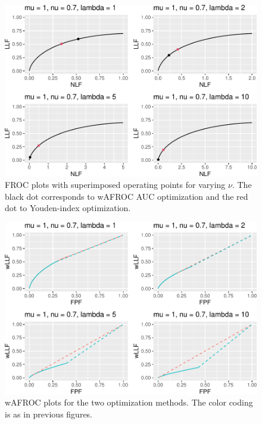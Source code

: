 \documentclass[
]{book}
\begin{document}
\begin{figure}
\centering
\includegraphics{21-optim-op-point_files/figure-latex/optim-op-point-low-performance-vary-lambda-vary-all-froc-1.pdf}
\caption{\label{fig:optim-op-point-low-performance-vary-lambda-vary-all-froc}FROC plots with superimposed operating points for varying \(\nu\). The black dot corresponds to wAFROC AUC optimization and the red dot to Youden-index optimization.}
\end{figure}

\begin{figure}
\centering
\includegraphics{21-optim-op-point_files/figure-latex/optim-op-point-low-performance-vary-lambda-vary-all-wafroc-1.pdf}
\caption{\label{fig:optim-op-point-low-performance-vary-lambda-vary-all-wafroc}wAFROC plots for the two optimization methods. The color coding is as in previous figures.}
\end{figure}
\end{document}
